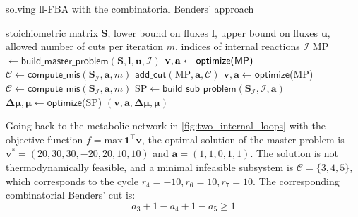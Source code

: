 \begin{algorithm}
    \caption{solving ll-FBA with the combinatorial Benders' approach}\label{alg:CB}
    \begin{algorithmic}[1]
        \Require stoichiometric matrix $\mathbf S$, lower bound on fluxes $\mathbf l$, upper bound on fluxes $\mathbf u$, allowed number of cuts per iteration $m$, indices of internal reactions $\mathcal{I}$
        \State MP $\gets \textsf{build\_master\_problem}(\mathbf S, \mathbf l, \mathbf u, \mathcal{I})$
        \State $\bold{v, a} \gets \textsf{optimize(MP)}$ 
        \State $\mathcal{C} \gets \textsf{compute\_mis}(\mathbf S_\mathcal{I}, \boldsymbol a, m)$ 
            \State $\textsf{add\_cut}(\text{MP}, \boldsymbol a, \mathcal{C})$ 
            \State $\mathbf v, \boldsymbol a \gets \textsf{optimize}$(MP)
            \State $\mathcal{C} \gets \textsf{compute\_mis}(\mathbf S_\mathcal{I}, \boldsymbol a, m)$
        \EndWhile
        \State $\text{SP} \gets \textsf{build\_sub\_problem}(\mathbf S_\mathcal{I}, \mathcal{I}, \boldsymbol a)$
        \State $\boldsymbol{\Delta \mu}, \boldsymbol \mu \gets \textsf{optimize}$(SP)
    \State \Return $(\mathbf v, \boldsymbol a, \boldsymbol{\Delta \mu}, \boldsymbol \mu)$ 
    \end{algorithmic}
\end{algorithm}

\newpage
Going back to the metabolic network in \cref{fig:two_internal_loops}
with the objective function $f = \text{max} \, \mathbf 1^\intercal \mathbf v$, the optimal solution of the master problem is $\mathbf v^* = (20, 30, 30, -20, 20, 10, 10)$ and $\boldsymbol a = (1,1,0,1,1)$. 
The solution is not thermodynamically feasible, and a minimal infeasible subsystem is $\mathcal{C} = \{3, 4, 5\}$, which corresponds to the cycle $r_4=-10, r_6=10, r_7=10$. 
The corresponding combinatorial Benders' cut is:
\begin{equation*}
    a_3 + 1 - a_4 + 1 - a_5 \geq 1
\end{equation*}

